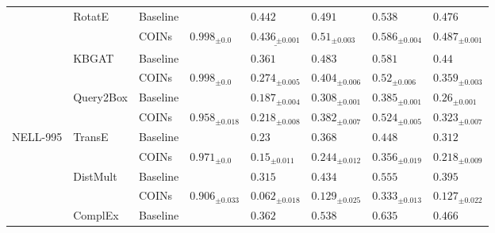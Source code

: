 \begin{table}[ht!]
\begin{adjustbox}{width=\textwidth}
\begin{tabular}{llllllll}
         & RotatE & Baseline &                          &                        ${{0.442}}$ &                        ${{0.491}}$ &                        ${{0.538}}$ &                        ${{0.476}}$ \\
         &           & COINs &    ${{0.998}_{\pm 0.0}}$ &  $\underline{{0.436}_{\pm 0.001}}$ &      $\mathbf{{0.51}_{\pm 0.003}}$ &     $\mathbf{{0.586}_{\pm 0.004}}$ &     $\mathbf{{0.487}_{\pm 0.001}}$ \\
         & KBGAT & Baseline &                          &                        ${{0.361}}$ &                        ${{0.483}}$ &                        ${{0.581}}$ &                         ${{0.44}}$ \\
         &           & COINs &    ${{0.998}_{\pm 0.0}}$ &            ${{0.274}_{\pm 0.005}}$ &            ${{0.404}_{\pm 0.006}}$ &             ${{0.52}_{\pm 0.006}}$ &            ${{0.359}_{\pm 0.003}}$ \\
         & Query2Box & Baseline &                          &            ${{0.187}_{\pm 0.004}}$ &            ${{0.308}_{\pm 0.001}}$ &            ${{0.385}_{\pm 0.001}}$ &             ${{0.26}_{\pm 0.001}}$ \\
         &           & COINs &  ${{0.958}_{\pm 0.018}}$ &     $\mathbf{{0.218}_{\pm 0.008}}$ &     $\mathbf{{0.382}_{\pm 0.007}}$ &     $\mathbf{{0.524}_{\pm 0.005}}$ &     $\mathbf{{0.323}_{\pm 0.007}}$ \\
\midrule
NELL-995 & TransE & Baseline &                          &                         ${{0.23}}$ &                        ${{0.368}}$ &                        ${{0.448}}$ &                        ${{0.312}}$ \\
         &           & COINs &    ${{0.971}_{\pm 0.0}}$ &             ${{0.15}_{\pm 0.011}}$ &            ${{0.244}_{\pm 0.012}}$ &            ${{0.356}_{\pm 0.019}}$ &            ${{0.218}_{\pm 0.009}}$ \\
         & DistMult & Baseline &                          &                        ${{0.315}}$ &                        ${{0.434}}$ &                        ${{0.555}}$ &                        ${{0.395}}$ \\
         &           & COINs &  ${{0.906}_{\pm 0.033}}$ &            ${{0.062}_{\pm 0.018}}$ &            ${{0.129}_{\pm 0.025}}$ &            ${{0.333}_{\pm 0.013}}$ &            ${{0.127}_{\pm 0.022}}$ \\
         & ComplEx & Baseline &                          &                        ${{0.362}}$ &                        ${{0.538}}$ &                        ${{0.635}}$ &                        ${{0.466}}$ \\

\end{tabular}
\end{adjustbox}
\end{table}
